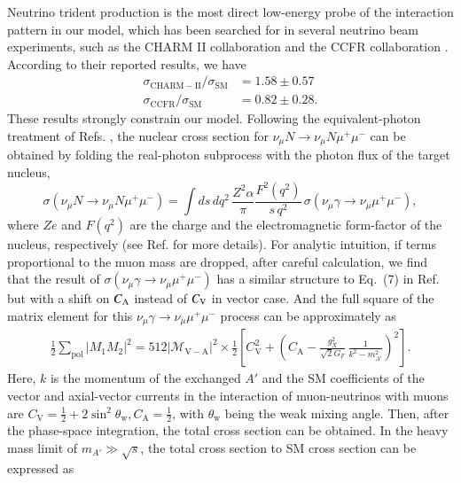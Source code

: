 \documentclass[onecolumn, aps, nofootinbib, prd, preprint, floats, floatfix, amsmath, amssymb, superscriptaddress, preprintnumbers]{revtex4-1}
\begin{document}
Neutrino trident production is the most direct low-energy probe of the interaction pattern in our model, which has been searched for in several neutrino beam experiments, such as the CHARM II collaboration \cite{geiregat1990first} and the CCFR collaboration \cite{CCFR:1991lpl}. According to their reported results, we have 
\begin{equation}
\begin{aligned}
\sigma_{\mathrm{CHARM}-\mathrm{II}} / \sigma_{\mathrm{SM}} & =1.58 \pm 0.57 \\
\sigma_{\mathrm{CCFR}} / \sigma_{\mathrm{SM}} & =0.82 \pm 0.28.
\end{aligned}
\end{equation}
These results strongly constrain our model.
Following the equivalent-photon treatment of Refs. \cite{Williams:1934ad,Belusevic:1987cw,Altmannshofer:2014pba}, the nuclear cross section for $\nu_\mu N\to \nu_\mu N\mu^+\mu^-$ can be obtained by folding the real-photon subprocess with the photon flux of the target nucleus,
\begin{equation}
\sigma(\nu_\mu N\to\nu_\mu N\mu^+\mu^-)
=\int ds\,dq^2\,
\frac{Z^2\alpha}{\pi}\frac{F^2(q^2)}{s\,q^2}\,
\sigma(\nu_\mu\gamma\to\nu_\mu\mu^+\mu^-),
\label{eq:trident-epa}
\end{equation}
where $Ze$ and $F(q^2)$ are the charge and the electromagnetic form-factor of the nucleus, respectively (see Ref. \cite{Altmannshofer:2014pba} for more details).
For analytic intuition, if terms proportional to the muon mass are dropped, after careful calculation, we find that the result of $\sigma(\nu_\mu\gamma\to\nu_\mu\mu^+\mu^-)$ has a similar structure to Eq.~(7) in Ref.~\cite{Altmannshofer:2014pba} but with a shift on $C_{\rm A}$ instead of $C_{\rm V}$ in vector case.
And the full square of the matrix element for this $\nu_\mu\gamma\to\nu_\mu\mu^+\mu^-$ process can be approximately as
\begin{equation}
\begin{aligned}
\frac{1}{2} \sum_{\mathrm{pol}}\left|M_1 M_2\right|^2=512\left|\mathcal{M}_{\mathrm{V}-\mathrm{A}}\right|^2 \times \frac{1}{2}\left[C_{\mathrm{V}}^2+\left(C_{\mathrm{A}}-\frac{g_X^2}{\sqrt2G_F}\,
\frac{1}{k^2-m_{A'}^2}\right)^2 \right].
\end{aligned}
\end{equation}
Here, $k$ is the momentum of the exchanged $A'$ and the SM coefficients of the vector and axial-vector currents in the interaction of muon-neutrinos with muons are $C_{\mathrm{V}}=\frac{1}{2}+ 2 \sin ^2 \theta_{\mathrm{w}}, C_{\mathrm{A}}=\frac{1}{2}$, with $\theta_{\mathrm{w}}$ being the weak mixing angle. Then, after the phase-space integration, the total cross section can be obtained. In the heavy mass limit of $m_{A'}\gg\sqrt{s}$, the total cross section to SM cross section can be expressed as
\end{document}
